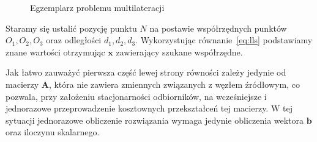 \begin{figure}[!h]
    \centering
    \caption{Egzemplarz problemu multilateracji}
    \label{fig:example}
\end{figure}

Staramy się ustalić pozycję punktu $N$ na postawie współrzędnych punktów $O_1, O_2, O_3$ oraz odległości $d_1, d_2, d_3$. Wykorzystując równanie~\ref{eq:lls} podstawiamy znane wartości otrzymując $\mathbf{x}$ zawierający szukane współrzędne. 

Jak łatwo zauważyć pierwsza część lewej strony równości zależy jedynie od macierzy $\mathbf{A}$, która nie zawiera zmiennych związanych z węzłem źródłowym, co pozwala, przy założeniu stacjonarności odbiorników, na wcześniejsze i jednorazowe przeprowadzenie kosztownych przekształceń tej macierzy. W tej sytuacji jednorazowe obliczenie rozwiązania wymaga jedynie obliczenia wektora $\mathbf{b}$ oraz iloczynu skalarnego.
